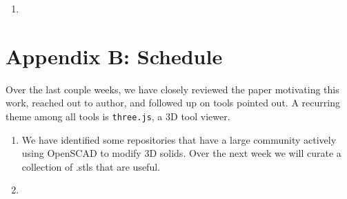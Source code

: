 \documentclass[sigconf,authorversion,nonacm]{acmart}
\begin{document}
\begin{enumerate}
	\item

\end{enumerate}




\section{Appendix B: Schedule}

Over the last couple weeks, we have closely reviewed the paper motivating this work, reached out to author, and followed up on tools pointed out. A recurring theme among all tools is \texttt{three.js}, a 3D tool viewer.



\begin{enumerate}
	\item We have identified some repositories that have a large community actively using OpenSCAD to modify 3D solids. Over the next week we will curate a collection of .stls that are useful.
	\item
\end{enumerate}


\end{document}
